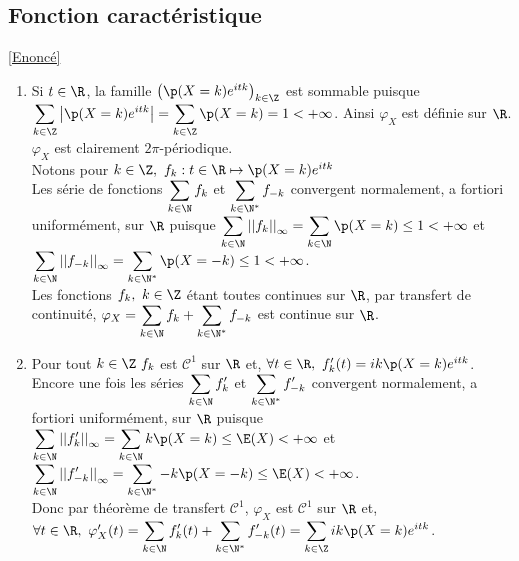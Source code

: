 \documentclass[8pt]{book}
\begin{document}
	\subsection{Fonction caractéristique }
	\label{Fonction caractéristique corrigé}
	\textcolor{blue}{\hyperref[Fonction caractéristique]{[Enoncé]}}\\
	\begin{enumerate}
		\item Si $t\in \R$, la famille $\left(\p(X=k)e^{itk}\right)_{k\in \Z}$ est sommable puisque $\displaystyle\sum\limits_{k\in \Z}\left|\p(X=k)e^{itk}\right|=\sum\limits_{k\in \Z}\p(X=k)=1<+\infty$. Ainsi $\varphi_X$ est définie sur $\R$. $\varphi_X$ est clairement $2\pi$-périodique.\\
		Notons pour $k\in \Z,\ f_k:t\in \R\mapsto \p(X=k)e^{itk}$\\
		Les série de fonctions $\displaystyle\sum\limits_{k\in \N}f_k$ et $\displaystyle\sum\limits_{k\in \N^*}f_{-k}$ convergent normalement, a fortiori uniformément, sur $\R$ puisque $\displaystyle\sum\limits_{k\in \N}{||f_k||}_\infty=\displaystyle\sum\limits_{k\in \N}\p(X=k)\leq 1<+\infty$ et $\displaystyle\sum\limits_{k\in \N}{||f_{-k}||}_\infty=\displaystyle\sum\limits_{k\in \N^*}\p(X=-k)\leq 1<+\infty$.\\
		Les fonctions $f_k,\ k\in \Z$ étant toutes continues sur $\R$, par transfert de continuité, $\varphi_X=\displaystyle\sum\limits_{k\in \N}f_k+\displaystyle\sum\limits_{k\in \N^*}f_{-k}$ est continue sur $\R$.
		\item Pour tout $k\in \Z\ f_k$ est $\mathcal{C}^1$ sur $\R$ et, $\forall t\in \R,\ f_k'(t)=ik\p(X=k)e^{itk}$.\\
		Encore une fois les séries $\displaystyle\sum\limits_{k\in \N}f_k'$ et $\displaystyle\sum\limits_{k\in \N^*}f_{-k}'$ convergent normalement, a fortiori uniformément, sur $\R$ puisque $\displaystyle\sum\limits_{k\in \N}{||f_k'||}_\infty=\displaystyle\sum\limits_{k\in \N}k\p(X=k)\leq \E(X)<+\infty$ et $\displaystyle\sum\limits_{k\in \N}{||f_{-k}'||}_\infty=\displaystyle\sum\limits_{k\in \N^*}-k\p(X=-k)\leq \E(X)<+\infty$.\\
		Donc par théorème de transfert $\mathcal{C}^1$, $\varphi_X$ est $\mathcal{C}^1$ sur $\R$ et,\\
		$\forall t\in \R,\ \varphi_X'(t)=\displaystyle\sum\limits_{k\in \N}f_k'(t)+\displaystyle\sum\limits_{k\in \N^*}f_{-k}'(t)=\sum\limits_{k\in \Z}ik\p(X=k)e^{itk}$.\\\\\\

\end{enumerate}
\end{document}
